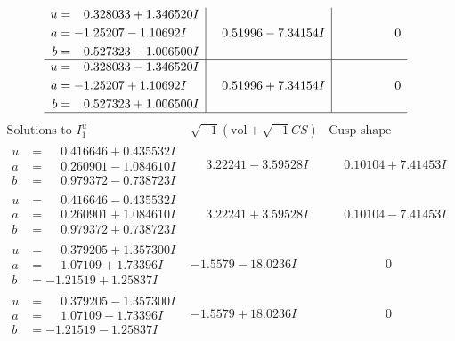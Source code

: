 \documentclass[1p]{elsarticle_modified}
\theoremstyle{definition}
\newcommand{\I}{\sqrt{-1}}
\begin{document}
$$\begin{array}{c|c|c}
\begin{aligned}
u &= \phantom{-}0.328033 + 1.346520 I \\
a &= -1.25207 - 1.10692 I \\
b &= \phantom{-}0.527323 - 1.006500 I\end{aligned}
 & \phantom{-}0.51996 - 7.34154 I & \phantom{-0.000000 } 0 \\ \hline\begin{aligned}
u &= \phantom{-}0.328033 - 1.346520 I \\
a &= -1.25207 + 1.10692 I \\
b &= \phantom{-}0.527323 + 1.006500 I\end{aligned}
 & \phantom{-}0.51996 + 7.34154 I & \phantom{-0.000000 } 0\\
 \hline 
 \end{array}$$\newpage$$\begin{array}{c|c|c}  
\text{Solutions to }I^u_{1}& \I (\text{vol} + \sqrt{-1}CS) & \text{Cusp shape}\\
 \hline 
\begin{aligned}
u &= \phantom{-}0.416646 + 0.435532 I \\
a &= \phantom{-}0.260901 - 1.084610 I \\
b &= \phantom{-}0.979372 - 0.738723 I\end{aligned}
 & \phantom{-}3.22241 - 3.59528 I & \phantom{-}0.10104 + 7.41453 I \\ \hline\begin{aligned}
u &= \phantom{-}0.416646 - 0.435532 I \\
a &= \phantom{-}0.260901 + 1.084610 I \\
b &= \phantom{-}0.979372 + 0.738723 I\end{aligned}
 & \phantom{-}3.22241 + 3.59528 I & \phantom{-}0.10104 - 7.41453 I \\ \hline\begin{aligned}
u &= \phantom{-}0.379205 + 1.357300 I \\
a &= \phantom{-}1.07109 + 1.73396 I \\
b &= -1.21519 + 1.25837 I\end{aligned}
 & -1.5579 - 18.0236 I & \phantom{-0.000000 } 0 \\ \hline\begin{aligned}
u &= \phantom{-}0.379205 - 1.357300 I \\
a &= \phantom{-}1.07109 - 1.73396 I \\
b &= -1.21519 - 1.25837 I\end{aligned}
 & -1.5579 + 18.0236 I & \phantom{-0.000000 } 0 \\ \hline\begin{aligned}

\end{aligned}
\end{array}$$
\end{document}
